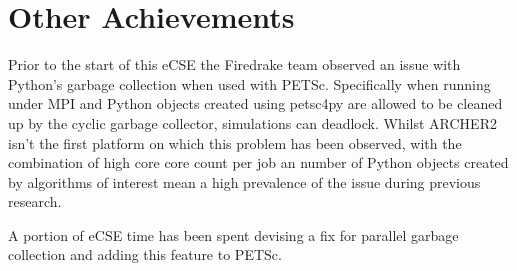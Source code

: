 \documentclass[a4paper,11pt]{article}
\begin{document}
\clearpage
\section{Other Achievements}
\label{sec:other}
Prior to the start of this eCSE the Firedrake team observed an issue with Python's garbage collection when used with PETSc.
Specifically when running under MPI and Python objects created using petsc4py are allowed to be cleaned up by the cyclic garbage collector, simulations can deadlock.
Whilst ARCHER2 isn't the first platform on which this problem has been observed, with the combination of high core core count per job an number of Python objects created by algorithms of interest mean a high prevalence of the issue during previous research.

A portion of eCSE time has been spent devising a fix for parallel garbage collection and adding this feature to PETSc.
\end{document}
